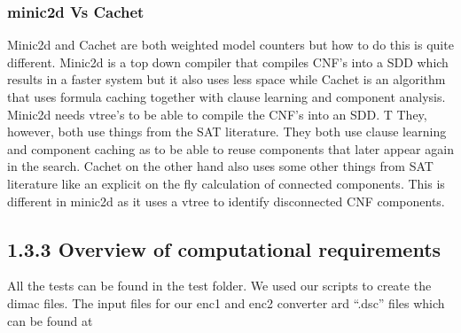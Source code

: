 \documentclass[a4paper,10pt]{report}
\begin{document}
\subsubsection*{minic2d Vs Cachet}
Minic2d and Cachet are both weighted model counters but how to do this is quite different.
Minic2d is a top down compiler that compiles CNF's into a SDD which results in a faster system but it also uses less space while Cachet is an algorithm that uses formula caching together with clause learning and component analysis. Minic2d needs vtree's to be able to compile the CNF's into an SDD. 
T%
They, however, both use things from the SAT literature. 
They both use clause learning and component caching as to be able to reuse components that later appear again in the search. Cachet on the other hand also uses some other things from SAT literature like an explicit on the fly calculation of connected components. This is different in minic2d as it uses a vtree to identify disconnected CNF components. 

\cite{minic2d} \cite{Cachet}



\subsection*{1.3.3 Overview of computational requirements}
All the tests can be found in the test folder.
We used our scripts to create the dimac files. The input files for our enc1 and enc2 converter ard ``.dsc'' files which can be found at 
\end{document}
